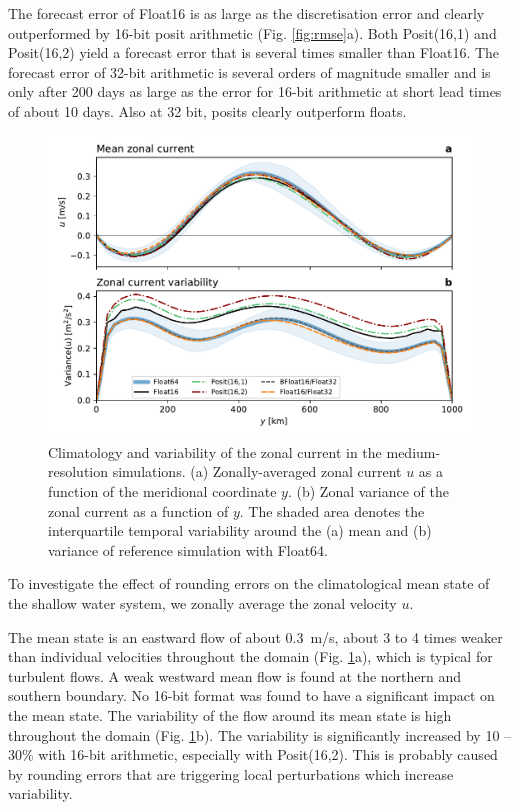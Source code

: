 \documentclass[draft]{agujournal2019}
\begin{document}
The forecast error of Float16 is as large as the discretisation error and
clearly outperformed by 16-bit posit arithmetic (Fig. \ref{fig:rmse}a).
Both Posit(16,1) and Posit(16,2) yield a forecast error that is several times
smaller than Float16. The forecast error of 32-bit arithmetic is several orders
of magnitude smaller and is only after 200 days as large as the error for 16-bit
arithmetic at short lead times of about 10 days. Also at 32 bit, posits clearly
outperform floats.

\begin{figure}
\includegraphics[width=1\textwidth]{meanvar_u.pdf}
\caption{Climatology and variability of the zonal current in the medium-resolution
simulations. (a) Zonally-averaged zonal current $u$ as a function of the meridional
coordinate $y$. (b) Zonal variance of the zonal current as a function of $y$.
The shaded area denotes the interquartile temporal variability around the (a) mean and
(b) variance of reference simulation with Float64.}
\label{fig:mean}
\end{figure}

To investigate the effect of rounding errors on the climatological mean state of
the shallow water system, we zonally average the zonal velocity $u$. 

The mean state is an eastward flow of about 0.3~m/s, about 3 to 4 times weaker than
individual velocities throughout the domain (Fig. \ref{fig:mean}a), which is typical
for turbulent flows. A weak westward mean flow is found at the northern and
southern boundary. No 16-bit format was found to have a significant impact on
the mean state. The variability of the flow around its mean state is high
throughout the domain (Fig. \ref{fig:mean}b). The variability is significantly
increased by 10 -- 30\% with 16-bit arithmetic, especially with Posit(16,2).
This is probably caused by rounding errors that are triggering local
perturbations which increase variability.
\end{document}
